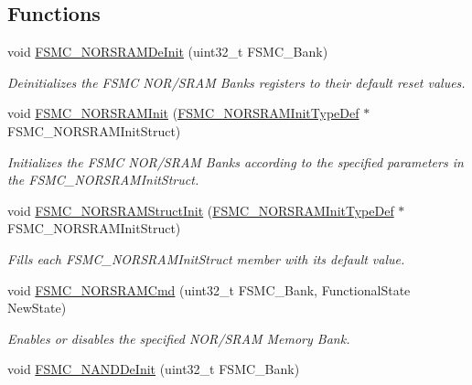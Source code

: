 \subsection*{Functions}
\begin{DoxyCompactItemize}
\item 
void \hyperlink{group___f_s_m_c_gaab3e6648e8a584e73785361ac960eded}{F\-S\-M\-C\-\_\-\-N\-O\-R\-S\-R\-A\-M\-De\-Init} (uint32\-\_\-t F\-S\-M\-C\-\_\-\-Bank)
\begin{DoxyCompactList}\small\item\em Deinitializes the F\-S\-M\-C N\-O\-R/\-S\-R\-A\-M Banks registers to their default reset values. \end{DoxyCompactList}\item 
void \hyperlink{group___f_s_m_c_ga9c27816e8b17394c9ee1ce9298917b4a}{F\-S\-M\-C\-\_\-\-N\-O\-R\-S\-R\-A\-M\-Init} (\hyperlink{struct_f_s_m_c___n_o_r_s_r_a_m_init_type_def}{F\-S\-M\-C\-\_\-\-N\-O\-R\-S\-R\-A\-M\-Init\-Type\-Def} $\ast$F\-S\-M\-C\-\_\-\-N\-O\-R\-S\-R\-A\-M\-Init\-Struct)
\begin{DoxyCompactList}\small\item\em Initializes the F\-S\-M\-C N\-O\-R/\-S\-R\-A\-M Banks according to the specified parameters in the F\-S\-M\-C\-\_\-\-N\-O\-R\-S\-R\-A\-M\-Init\-Struct. \end{DoxyCompactList}\item 
void \hyperlink{group___f_s_m_c_gaf33e6dfc34f62d16a0cb416de9e83d28}{F\-S\-M\-C\-\_\-\-N\-O\-R\-S\-R\-A\-M\-Struct\-Init} (\hyperlink{struct_f_s_m_c___n_o_r_s_r_a_m_init_type_def}{F\-S\-M\-C\-\_\-\-N\-O\-R\-S\-R\-A\-M\-Init\-Type\-Def} $\ast$F\-S\-M\-C\-\_\-\-N\-O\-R\-S\-R\-A\-M\-Init\-Struct)
\begin{DoxyCompactList}\small\item\em Fills each F\-S\-M\-C\-\_\-\-N\-O\-R\-S\-R\-A\-M\-Init\-Struct member with its default value. \end{DoxyCompactList}\item 
void \hyperlink{group___f_s_m_c_gaf943f0f2680168d3a95a3c2c9f3eca2a}{F\-S\-M\-C\-\_\-\-N\-O\-R\-S\-R\-A\-M\-Cmd} (uint32\-\_\-t F\-S\-M\-C\-\_\-\-Bank, Functional\-State New\-State)
\begin{DoxyCompactList}\small\item\em Enables or disables the specified N\-O\-R/\-S\-R\-A\-M Memory Bank. \end{DoxyCompactList}\item 
void \hyperlink{group___f_s_m_c_gafb749503293474a68555961bd8f120e1}{F\-S\-M\-C\-\_\-\-N\-A\-N\-D\-De\-Init} (uint32\-\_\-t F\-S\-M\-C\-\_\-\-Bank)

\end{DoxyCompactItemize}
